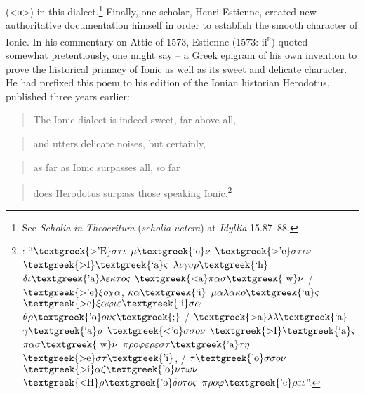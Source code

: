 \documentclass[output=paper]{langsci/langscibook}
\begin{document}
(<α>) in this dialect.\footnote{See \textit{Scholia} \textit{in} \textit{Theocritum} (\textit{scholia} \textit{uetera}) at \textit{Idyllia} 15.87–88.} Finally, one scholar, Henri Estienne, created new authoritative documentation himself in order to establish the smooth character of Ionic. In his commentary on Attic of 1573, Estienne (1573: ii\textsc{\textsuperscript{r}}) quoted – somewhat pretentiously, one might say – a Greek epigram of his own invention to prove the historical primacy of Ionic as well as its sweet and delicate character. He had prefixed this poem to his edition of the Ionian historian Herodotus, published three years earlier:

\begin{quote}
The Ionic dialect is indeed sweet, far above all,
\end{quote}

\begin{quote}
and utters delicate noises, but certainly,
\end{quote}

\begin{quote}
as far as Ionic surpasses all, so far
\end{quote}

\begin{quote}
does Herodotus surpass those speaking Ionic.\footnote{\citet[8]{Estienne1570}: “$\text{\textgreek{>'E}}\sigma \tau \iota $ $\mu \text{\textgreek{`e}}\nu $ $\text{\textgreek{>'e}}\sigma \tau \iota \nu $ $\text{\textgreek{>I}}\text{\textgreek{`a}}\varsigma $ $\lambda \iota \gamma \upsilon \rho \text{\textgreek{`h}}$ $\delta \iota \text{\textgreek{'a}}\lambda \varepsilon \kappa \tau o\varsigma $ $\text{\textgreek{<a}}\pi \alpha \sigma \text{\textgreek{~w}}\nu $ / $\text{\textgreek{>'e}}\xi o\chi \alpha $, $\kappa \alpha \text{\textgreek{`i}}$ $\mu \alpha \lambda \alpha \kappa o\text{\textgreek{`u}}\varsigma $ $\text{\textgreek{>e}}\xi \alpha \varphi \iota \varepsilon \text{\textgreek{~i}}\sigma \alpha $ $\theta \rho \text{\textgreek{'o}}o\upsilon \varsigma \text{\textgreek{;}}$ / $\text{\textgreek{>a}}\lambda \lambda \text{\textgreek{`a}}$ $\gamma \text{\textgreek{`a}}\rho $ $\text{\textgreek{<'o}}\sigma \sigma o\nu $ $\text{\textgreek{>I}}\text{\textgreek{`a}}\varsigma $ $\pi \alpha \sigma \text{\textgreek{~w}}\nu $ $\pi \rho o\varphi \varepsilon \rho \varepsilon \sigma \tau \text{\textgreek{'a}}\tau \eta $ $\text{\textgreek{>e}}\sigma \tau \text{\textgreek{'i}}$, / $\tau \text{\textgreek{'o}}\sigma \sigma o\nu $ $\text{\textgreek{>i}}\alpha \zeta \text{\textgreek{'o}}\nu \tau \omega \nu $ $\text{\textgreek{<H}}\rho \text{\textgreek{'o}}\delta o\tau o\varsigma $ $\pi \rho o\varphi \text{\textgreek{'e}}\rho \varepsilon \iota $”.}
\end{quote}
\end{document}
